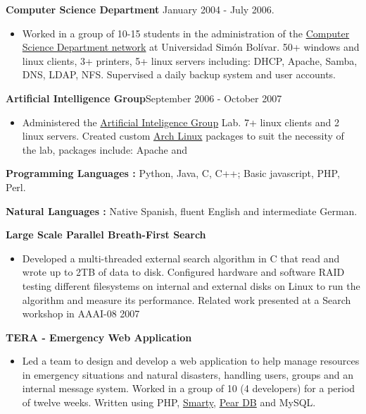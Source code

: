\documentclass[10pt]{article}
\newcommand{\vitem}{\vspace*{-.4pc}\item}
\begin{document}
\noindent\textbf{Computer Science Department} \hfill January 2004 -
  July 2006.
\begin{itemize}
\vitem Worked in a group of 10-15 students in the administration of the
  \href{http://www.ldc.usb.ve}{Computer Science Department network}
  at Universidad Simón Bolívar. 50+ windows and linux clients, 3+
  printers, 5+ linux servers including: DHCP, Apache, Samba, DNS,
  LDAP, NFS. Supervised a daily backup system and user accounts.
\end{itemize}

\noindent\textbf{Artificial Intelligence Group}\hfill September 2006 - October 2007
\begin{itemize}
  \vitem Administered the \href{http://www.gia.usb.ve}{Artificial
    Inteligence Group} Lab. 7+ linux clients and 2 linux
  servers. Created custom \href{http://www.archlinux.org/}{Arch Linux}
  packages to suit the necessity of the lab, packages include: Apache
  and \LaTeXe{}
\end{itemize}

\flushleft\textbf{Programming Languages :} Python, Java, C, C++; Basic
javascript, PHP, Perl.

\noindent\textbf{Natural Languages :} Native Spanish, fluent English
and intermediate German.

\vspace{1pc}
\flushleft\textbf{Large Scale Parallel Breath-First Search}
\begin{itemize}
  \vitem Developed a multi-threaded external search algorithm in C
  that read and wrote up to 2TB of data to disk. Configured hardware and
  software RAID testing different filesystems on internal and external
  disks on Linux to run the algorithm and measure its
  performance. Related work presented at a Search workshop in AAAI-08
  \hfill 2007
\end{itemize}

\textbf{TERA - Emergency Web Application}
\begin{itemize}
\item Led a team to design and develop a web application to help
  manage resources in emergency situations and natural disasters,
  handling users, groups and an internal message system. Worked in a
  group of 10 (4 developers) for a period of twelve weeks. Written
  using PHP, \href{www.smarty.net/}{Smarty},
  \href{pear.php.net/package/DB}{Pear DB} and MySQL.
\end{itemize}
\end{document}
